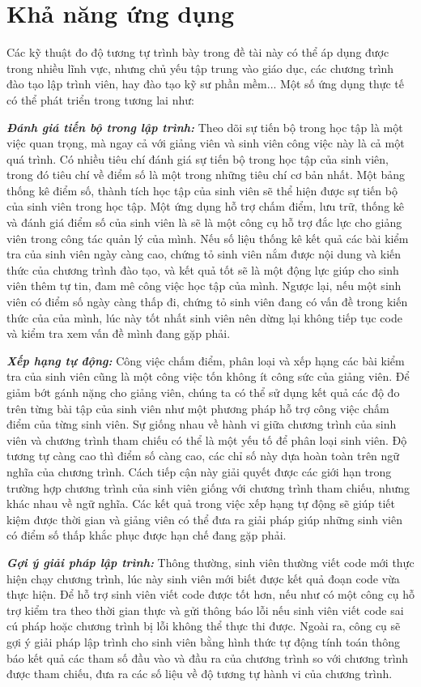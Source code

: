 \section{Khả năng ứng dụng}
Các kỹ thuật đo độ tương tự trình bày trong đề tài này có thể áp dụng được trong nhiều lĩnh vực, nhưng chủ yếu tập trung vào giáo dục, các chương trình đào tạo lập trình viên, hay đào tạo kỹ sư phần mềm... Một số ứng dụng thực tế có thể phát triển trong tương lai như: 

\textbf{\textit{Đánh giá tiến bộ trong lập trình:}} Theo dõi sự tiến bộ trong học tập là một việc quan trọng, mà ngay cả với giảng viên và sinh viên công việc này là cả một quá trình. Có nhiều tiêu chí đánh giá sự tiến bộ trong học tập của sinh viên, trong đó tiêu chí về điểm số là một trong những tiêu chí cơ bản nhất. Một bảng thống kê điểm số, thành tích học tập của sinh viên sẽ thể hiện được sự tiến bộ của sinh viên trong học tập. Một ứng dụng hỗ trợ chấm điểm, lưu trữ, thống kê và đánh giá điểm số của sinh viên là sẽ là một công cụ hỗ trợ đắc lực cho giảng viên trong công tác quản lý của mình. Nếu số liệu thống kê kết quả các bài kiểm tra của sinh viên ngày càng cao, chứng tỏ sinh viên nắm được nội dung và kiến thức của chương trình đào tạo, và kết quả tốt sẽ là một động lực giúp cho sinh viên thêm tự tin, đam mê công việc học tập của mình. Ngược lại, nếu một sinh viên có điểm số ngày càng thấp đi, chứng tỏ sinh viên đang có vấn đề trong kiến thức của của mình, lúc này tốt nhất sinh viên nên dừng lại không tiếp tục code và kiểm tra xem vấn đề mình đang gặp phải. 

\textit{\textbf{Xếp hạng tự động:}} Công việc chấm điểm, phân loại và xếp hạng các bài kiểm tra của sinh viên cũng là một công việc tốn không ít công sức của giảng viên. Để giảm bớt gánh nặng cho giảng viên, chúng ta có thể sử dụng kết quả các độ đo trên từng bài tập của sinh viên như một phương pháp hỗ trợ công việc chấm điểm của từng sinh viên. Sự giống nhau về hành vi giữa chương trình của sinh viên và chương trình tham chiếu có thể là một yếu tố để phân loại sinh viên. Độ tương tự càng cao thì điểm số càng cao, các chỉ số này dựa hoàn toàn trên ngữ nghĩa của chương trình. Cách tiếp cận này giải quyết được các giới hạn trong trường hợp chương trình của sinh viên giống với chương trình tham chiếu, nhưng khác nhau về ngữ nghĩa. Các kết quả trong việc xếp hạng tự động sẽ giúp tiết kiệm được thời gian và giảng viên có thể đưa ra giải pháp giúp những sinh viên có điểm số thấp khắc phục được hạn chế đang gặp phải.

\textit{\textbf{Gợi ý giải pháp lập trình:}} Thông thường, sinh viên thường viết code mới thực hiện chạy chương trình, lúc này sinh viên mới biết được kết quả đoạn code vừa thực hiện. Để hỗ trợ sinh viên viết code được tốt hơn, nếu như có một công cụ hỗ trợ kiểm tra theo thời gian thực và gửi thông báo lỗi nếu sinh viên viết code sai cú pháp hoặc chương trình bị lỗi không thể thực thi được. Ngoài ra, công cụ sẽ gợi ý giải pháp lập trình cho sinh viên bằng hình thức tự động tính toán thông báo kết quả các tham số đầu vào và đầu ra của chương trình so với chương trình được tham chiếu, đưa ra các số liệu về độ tương tự hành vi của chương trình.	

